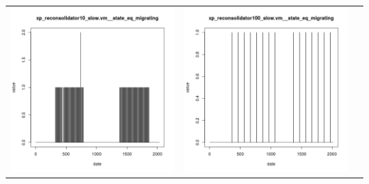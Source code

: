 \documentclass{beamer}
\begin{document}
\begin{frame}
\begin{tabular}{ccc}
\includegraphics[scale=0.22]{xp_reconsolidator10_slow_vm__state_eq_migrating}&
\includegraphics[scale=0.22]{xp_reconsolidator100_slow_vm__state_eq_migrating}\\
	\end{tabular}
\end{frame}
\end{document}
